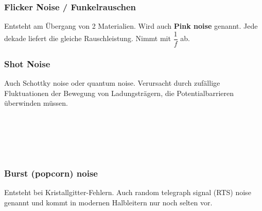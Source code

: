 
\subsubsection{Flicker Noise / Funkelrauschen}
Entsteht am Übergang von 2 Materialien.
Wird auch \textbf{Pink noise} genannt. Jede dekade liefert die gleiche Rauschleistung.
Nimmt mit $\dfrac{1}{f}$ ab.


\subsubsection{Shot Noise}
\begin{minipage}[t]{0.3\textwidth}
	\vspace{0pt}
	Auch Schottky noise oder quantum noise. Verursacht durch zufällige Fluktuationen der Bewegung von Ladungsträgern, die Potentialbarrieren überwinden müssen.
\end{minipage}\hspace{0.05\textwidth}
\begin{minipage}[t]{0.3\textwidth}
	\vspace{0pt}
\end{minipage}\hspace{0.05\textwidth}
\begin{minipage}[t]{0.3\textwidth}
	\\
	\\
	\\
	\\
\end{minipage}
\vspace{2mm}

\subsubsection{Burst (popcorn) noise}
Entsteht bei Kristallgitter-Fehlern. Auch random telegraph signal (RTS) noise genannt und kommt in modernen Halbleitern nur noch selten vor.

